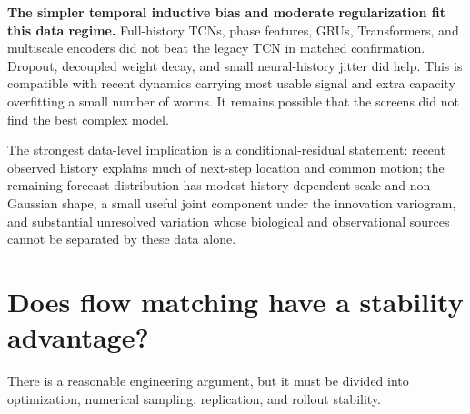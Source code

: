 \documentclass[11pt]{article}
\begin{document}
\textbf{The simpler temporal inductive bias and moderate regularization fit this data regime.} Full-history TCNs, phase features, GRUs, Transformers, and multiscale encoders did not beat the legacy TCN in matched confirmation. Dropout, decoupled weight decay, and small neural-history jitter did help. This is compatible with recent dynamics carrying most usable signal and extra capacity overfitting a small number of worms. It remains possible that the screens did not find the best complex model.

The strongest data-level implication is a conditional-residual statement: recent observed history explains much of next-step location and common motion; the remaining forecast distribution has modest history-dependent scale and non-Gaussian shape, a small useful joint component under the innovation variogram, and substantial unresolved variation whose biological and observational sources cannot be separated by these data alone.

\section{Does flow matching have a stability advantage?}

There is a reasonable engineering argument, but it must be divided into optimization, numerical sampling, replication, and rollout stability.
\end{document}

